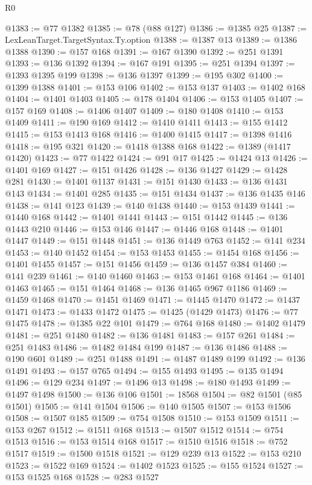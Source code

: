 \begin{lexlean}{R0}
\begin{coremodule}
@1383 := @77 @1382
@1385 := @78 (@88 @127)
@1386 := @1385 @25
@1387 := LexLeanTarget.TargetSyntax.Ty.option
@1388 := @1387 @13
@1389 := @1386 @1388
@1390 := @157 @168
@1391 := @167 @1390
@1392 := @251 @1391
@1393 := @136 @1392
@1394 := @167 @191
@1395 := @251 @1394
@1397 := @1393 @1395 @199
@1398 := @136 @1397
@1399 := @195 @302
@1400 := @1399 @1388
@1401 := @153 @106
@1402 := @153 @137
@1403 := @1402 @168
@1404 := @1401 @1403
@1405 := @178 @1404
@1406 := @153 @1405
@1407 := @157 @169
@1408 := @1406 @1407
@1409 := @180 @1408
@1410 := @153 @1409
@1411 := @190 @169
@1412 := @1410 @1411
@1413 := @155 @1412
@1415 := @153 @1413 @168
@1416 := @1400 @1415
@1417 := @1398 @1416
@1418 := @195 @321
@1420 := @1418 @1388 @168
@1422 := @1389 (@1417 @1420)
@1423 := @77 @1422
@1424 := @91 @17
@1425 := @1424 @13
@1426 := @1401 @169
@1427 := @151 @1426
@1428 := @136 @1427
@1429 := @1428 @281
@1430 := @1401 @1137
@1431 := @151 @1430
@1433 := @136 @1431 @143
@1434 := @1401 @285
@1435 := @151 @1434
@1437 := @136 @1435 @146
@1438 := @141 @123
@1439 := @140 @1438
@1440 := @153 @1439
@1441 := @1440 @168
@1442 := @1401 @1441
@1443 := @151 @1442
@1445 := @136 @1443 @210
@1446 := @153 @146
@1447 := @1446 @168
@1448 := @1401 @1447
@1449 := @151 @1448
@1451 := @136 @1449 @763
@1452 := @141 @234
@1453 := @140 @1452
@1454 := @153 @1453
@1455 := @1454 @168
@1456 := @1401 @1455
@1457 := @151 @1456
@1459 := @136 @1457 @384
@1460 := @141 @239
@1461 := @140 @1460
@1463 := @153 @1461 @168
@1464 := @1401 @1463
@1465 := @151 @1464
@1468 := @136 @1465 @967 @1186
@1469 := @1459 @1468
@1470 := @1451 @1469
@1471 := @1445 @1470
@1472 := @1437 @1471
@1473 := @1433 @1472
@1475 := @1425 (@1429 @1473)
@1476 := @77 @1475
@1478 := @1385 @22 @101
@1479 := @764 @168
@1480 := @1402 @1479
@1481 := @251 @1480
@1482 := @136 @1481
@1483 := @157 @261
@1484 := @251 @1483
@1486 := @1482 @1484 @199
@1487 := @136 @1486
@1488 := @190 @601
@1489 := @251 @1488
@1491 := @1487 @1489 @199
@1492 := @136 @1491
@1493 := @157 @765
@1494 := @155 @1493
@1495 := @135 @1494
@1496 := @129 @234
@1497 := @1496 @13
@1498 := @180 @1493
@1499 := @1497 @1498
@1500 := @136 @106
@1501 := 18568
@1504 := @82 @1501 (@85 @1501)
@1505 := @141 @1504
@1506 := @140 @1505
@1507 := @153 @1506
@1508 := @1507 @185
@1509 := @754 @1508
@1510 := @153 @1509
@1511 := @153 @267
@1512 := @1511 @168
@1513 := @1507 @1512
@1514 := @754 @1513
@1516 := @153 @1514 @168
@1517 := @1510 @1516
@1518 := @752 @1517
@1519 := @1500 @1518
@1521 := @129 @239 @13
@1522 := @153 @210
@1523 := @1522 @169
@1524 := @1402 @1523
@1525 := @155 @1524
@1527 := @153 @1525 @168
@1528 := @283 @1527

\end{coremodule}
\end{lexlean}
